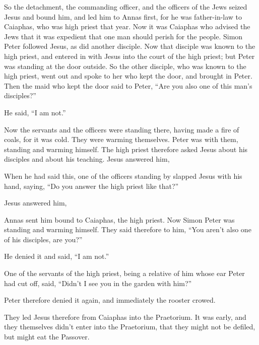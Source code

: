 {\par }{\PP {}So the detachment, the commanding officer, and the officers of the Jews seized Jesus and bound him,
and led him to Annas first, for he was father-in-law to Caiaphas, who was high priest that year.
Now it was Caiaphas who advised the Jews that it was expedient that one man should perish for the people.
Simon Peter followed Jesus, as did another disciple. Now that disciple was known to the high priest, and entered in with Jesus into the court of the high priest;
but Peter was standing at the door outside. So the other disciple, who was known to the high priest, went out and spoke to her who kept the door, and brought in Peter.
Then the maid who kept the door said to Peter, “Are you also one of this man’s disciples?”
\par }{\PP He said, “I am not.”
\par }{\PP {}Now the servants and the officers were standing there, having made a fire of coals, for it was cold. They were warming themselves. Peter was with them, standing and warming himself.
The high priest therefore asked Jesus about his disciples and about his teaching.
Jesus answered him,
{}
\par }{\PP {}When he had said this, one of the officers standing by slapped Jesus with his hand, saying, “Do you answer the high priest like that?”
\par }{\PP {}Jesus answered him,
{}
\par }{\PP {}Annas sent him bound to Caiaphas, the high priest.
Now Simon Peter was standing and warming himself. They said therefore to him, “You aren’t also one of his disciples, are you?”
\par }{\PP He denied it and said, “I am not.”
\par }{\PP {}One of the servants of the high priest, being a relative of him whose ear Peter had cut off, said, “Didn’t I see you in the garden with him?”
\par }{\PP {}Peter therefore denied it again, and immediately the rooster crowed.
\par }{\PP {}They led Jesus therefore from Caiaphas into the Praetorium. It was early, and they themselves didn’t enter into the Praetorium, that they might not be defiled, but might eat the Passover.
}
